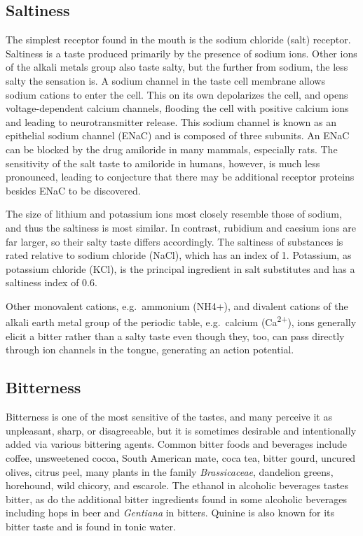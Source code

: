 \documentclass[]{book}
\begin{document}
\hypertarget{saltiness}{%
\subsection{Saltiness}\label{saltiness}}

The simplest receptor found in the mouth is the sodium chloride (salt) receptor. Saltiness is a taste produced primarily by the presence of sodium ions. Other ions of the alkali metals group also taste salty, but the further from sodium, the less salty the sensation is. A sodium channel in the taste cell membrane allows sodium cations to enter the cell. This on its own depolarizes the cell, and opens voltage-dependent calcium channels, flooding the cell with positive calcium ions and leading to neurotransmitter release. This sodium channel is known as an epithelial sodium channel (ENaC) and is composed of three subunits. An ENaC can be blocked by the drug amiloride in many mammals, especially rats. The sensitivity of the salt taste to amiloride in humans, however, is much less pronounced, leading to conjecture that there may be additional receptor proteins besides ENaC to be discovered.

The size of lithium and potassium ions most closely resemble those of sodium, and thus the saltiness is most similar. In contrast, rubidium and caesium ions are far larger, so their salty taste differs accordingly. The saltiness of substances is rated relative to sodium chloride (NaCl), which has an index of 1. Potassium, as potassium chloride (KCl), is the principal ingredient in salt substitutes and has a saltiness index of 0.6.

Other monovalent cations, e.g.~ammonium (NH4+), and divalent cations of the alkali earth metal group of the periodic table, e.g.~calcium (Ca\textsuperscript{2+}), ions generally elicit a bitter rather than a salty taste even though they, too, can pass directly through ion channels in the tongue, generating an action potential.

\hypertarget{bitterness}{%
\subsection{Bitterness}\label{bitterness}}

Bitterness is one of the most sensitive of the tastes, and many perceive it as unpleasant, sharp, or disagreeable, but it is sometimes desirable and intentionally added via various bittering agents. Common bitter foods and beverages include coffee, unsweetened cocoa, South American mate, coca tea, bitter gourd, uncured olives, citrus peel, many plants in the family \emph{Brassicaceae}, dandelion greens, horehound, wild chicory, and escarole. The ethanol in alcoholic beverages tastes bitter, as do the additional bitter ingredients found in some alcoholic beverages including hops in beer and \emph{Gentiana} in bitters. Quinine is also known for its bitter taste and is found in tonic water.
\end{document}
